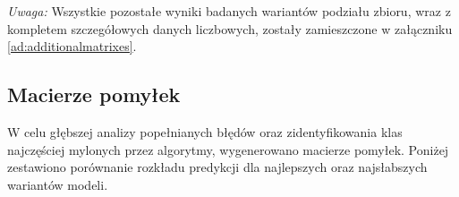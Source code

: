 \documentclass[12pt,a4paper]{article}
\begin{document}
\begin{table}[H]
    \centering
    \caption{Zestawienie najsłabszych wyników klasyfikacji dla badanych modeli}
    \label{tab:worst_results}
\end{table}

\noindent\textit{Uwaga:} Wszystkie pozostałe wyniki badanych wariantów podziału zbioru, wraz z kompletem szczegółowych danych liczbowych, zostały zamieszczone w załączniku \ref{ad:additionalmatrixes}.


\subsection{Macierze pomyłek}

W celu głębszej analizy popełnianych błędów oraz zidentyfikowania klas najczęściej mylonych przez algorytmy, wygenerowano macierze pomyłek. Poniżej zestawiono porównanie rozkładu predykcji dla najlepszych oraz najsłabszych wariantów modeli.


\end{document}
